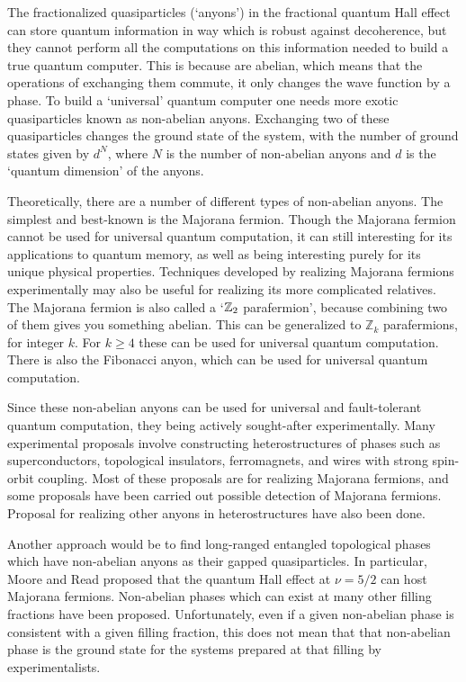 The fractionalized quasiparticles (`anyons') in the fractional quantum Hall effect can store quantum information in way which is robust against decoherence, but they cannot perform all the computations on this information needed to build a true quantum computer. This is because are abelian, which means that the operations of exchanging them commute, it only changes the wave function by a phase. To build a `universal' quantum computer one needs more exotic quasiparticles known as non-abelian anyons. Exchanging two of these quasiparticles changes the ground state of the system, with the number of ground states given by $d^N$, where $N$ is the number of non-abelian anyons and $d$ is the `quantum dimension' of the anyons. 

Theoretically, there are a number of different types of non-abelian anyons. The simplest and best-known is the Majorana fermion. Though the Majorana fermion cannot be used for universal quantum computation, it can still interesting for its applications to quantum memory, as well as being interesting purely for its unique physical properties. Techniques developed by realizing Majorana fermions experimentally may also be useful for realizing its more complicated relatives. The Majorana fermion is also called a `$\mathbb{Z}_2$ parafermion', because combining two of them gives you something abelian. This can be generalized to $\mathbb{Z}_k$ parafermions, for integer $k$. For $k\ge 4$ these can be used for universal quantum computation. There is also the Fibonacci anyon, which can be used for universal quantum computation.

Since these non-abelian anyons can be used for universal and fault-tolerant quantum computation, they being actively sought-after experimentally. Many experimental proposals involve constructing heterostructures of phases such as superconductors, topological insulators, ferromagnets, and wires with strong spin-orbit coupling. Most of these proposals are for realizing Majorana fermions, and some proposals have been carried out possible detection of Majorana fermions. Proposal for realizing other anyons in heterostructures have also been done.

Another approach would be to find long-ranged entangled topological phases which have non-abelian anyons as their gapped quasiparticles. In particular, Moore and Read\cite{MooreRead} proposed that the quantum Hall effect at $\nu=5/2$ can host Majorana fermions. Non-abelian phases which can exist at many other filling fractions have been proposed\cite{Read-PhysRevB.59.8084,BondersonSlingerland}. Unfortunately, even if a given non-abelian phase is consistent with a given filling fraction, this does not mean that that non-abelian phase is the ground state for the systems prepared at that filling by experimentalists. 

